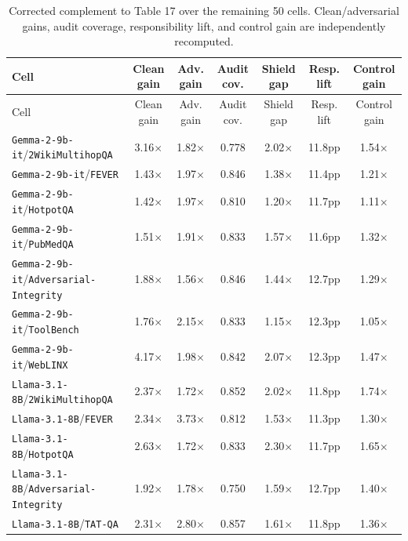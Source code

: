 
\begin{longtable}{lcccccc}
\caption{\footnotesize Corrected complement to Table 17 over the remaining 50 cells. Clean/adversarial gains, audit coverage, responsibility lift, and control gain are independently recomputed.}\label{tab:appendix_remaining_50_r1r4}\\
\toprule
Cell & Clean gain & Adv. gain & Audit cov. & Shield gap & Resp. lift & Control gain \\
\midrule
\endfirsthead
\toprule
Cell & Clean gain & Adv. gain & Audit cov. & Shield gap & Resp. lift & Control gain \\
\midrule
\endhead
\texttt{Gemma-2-9b-it}/\texttt{2WikiMultihopQA} & 3.16$\times$ & 1.82$\times$ & 0.778 & 2.02$\times$ & 11.8pp & 1.54$\times$ \\
\texttt{Gemma-2-9b-it}/\texttt{FEVER} & 1.43$\times$ & 1.97$\times$ & 0.846 & 1.38$\times$ & 11.4pp & 1.21$\times$ \\
\texttt{Gemma-2-9b-it}/\texttt{HotpotQA} & 1.42$\times$ & 1.97$\times$ & 0.810 & 1.20$\times$ & 11.7pp & 1.11$\times$ \\
\texttt{Gemma-2-9b-it}/\texttt{PubMedQA} & 1.51$\times$ & 1.91$\times$ & 0.833 & 1.57$\times$ & 11.6pp & 1.32$\times$ \\
\texttt{Gemma-2-9b-it}/\texttt{Adversarial-Integrity} & 1.88$\times$ & 1.56$\times$ & 0.846 & 1.44$\times$ & 12.7pp & 1.29$\times$ \\
\texttt{Gemma-2-9b-it}/\texttt{ToolBench} & 1.76$\times$ & 2.15$\times$ & 0.833 & 1.15$\times$ & 12.3pp & 1.05$\times$ \\
\texttt{Gemma-2-9b-it}/\texttt{WebLINX} & 4.17$\times$ & 1.98$\times$ & 0.842 & 2.07$\times$ & 12.3pp & 1.47$\times$ \\
\texttt{Llama-3.1-8B}/\texttt{2WikiMultihopQA} & 2.37$\times$ & 1.72$\times$ & 0.852 & 2.02$\times$ & 11.8pp & 1.74$\times$ \\
\texttt{Llama-3.1-8B}/\texttt{FEVER} & 2.34$\times$ & 3.73$\times$ & 0.812 & 1.53$\times$ & 11.3pp & 1.30$\times$ \\
\texttt{Llama-3.1-8B}/\texttt{HotpotQA} & 2.63$\times$ & 1.72$\times$ & 0.833 & 2.30$\times$ & 11.7pp & 1.65$\times$ \\
\texttt{Llama-3.1-8B}/\texttt{Adversarial-Integrity} & 1.92$\times$ & 1.78$\times$ & 0.750 & 1.59$\times$ & 12.7pp & 1.40$\times$ \\
\texttt{Llama-3.1-8B}/\texttt{TAT-QA} & 2.31$\times$ & 2.80$\times$ & 0.857 & 1.61$\times$ & 11.8pp & 1.36$\times$ \\

\end{longtable}
